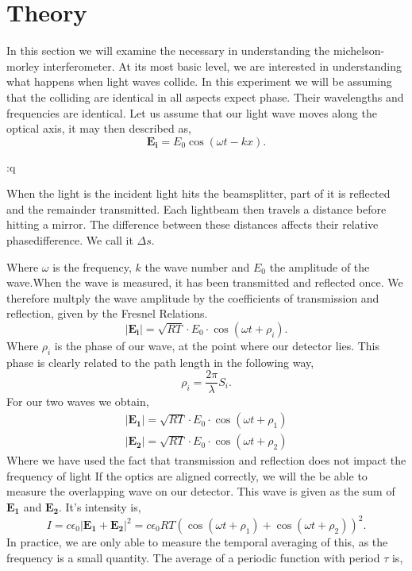 \documentclass[working, oneside]{inputs/tuftebook}
\begin{document}
\let\cleardoublepage\clearpage
\section*{Theory}
In this section we will examine the necessary in understanding the michelson-morley interferometer. At its most basic level, we are interested in understanding what happens when light waves collide. In this experiment we will be assuming that the colliding are identical in all aspects expect phase. Their wavelengths and frequencies are identical. Let us assume that our light wave moves along the optical axis, it may then described as,
\[
	\bm{E_i} = E_0 \cos\left( \omega t - kx \right) 
.\] 
\begin{marginfigure}:q
    \centering
    \caption{When the light is the incident light hits the beamsplitter, part of it is reflected and the remainder transmitted. Each lightbeam then travels a distance before hitting a mirror. The difference between these distances affects their relative phasedifference. We call it $\Delta s$.}
    \label{fig:fig1}
\end{marginfigure}
Where $\omega$ is the frequency, $k$ the wave number and $E_0$ the amplitude of the wave.When the wave is measured, it has been transmitted and reflected once. We therefore multply the wave amplitude by the coefficients of transmission and reflection, given by the Fresnel Relations.\cite{grif}
 \[
	 \left|\bm{E_i}\right| = \sqrt{RT} \cdot E_0 \cdot \cos\left( \omega t + \rho _i \right) 
.\] 
Where $\rho_i$ is the phase of our wave, at the point where our detector lies. This phase is clearly related to the path length in the following way,
\[
\rho _i  =  \frac{2\pi}{\lambda} S_i
.\]
For our two waves we obtain,
\begin{align*}
	\left|\bm{E_1}\right| = \sqrt{RT} \cdot E_0 \cdot \cos\left( \omega t + \rho _1 \right) \\
	\left|\bm{E_2}\right| = \sqrt{RT} \cdot E_0 \cdot \cos\left( \omega t + \rho _2 \right) 
\end{align*}
Where we have used the fact that transmission and reflection does not impact the frequency of light
If the optics are aligned correctly, we will the be able to measure the overlapping wave on our detector. This wave is given as the sum of $\bm{E_1}$ and $\bm{E_2}$. It's intensity is,
\[
I = c\epsilon_0 \left| \bm{E_1}+\bm{E_2} \right| ^2 = c\epsilon_0RT \left( \cos\left( \omega t +\rho_1 \right) +\cos\left( \omega t +\rho_2 \right)   \right)^2
.\] 
In practice, we are only able to measure the temporal averaging of this, as the frequency is a small quantity. The average of a periodic function with period $\tau$ is,
\end{document}
